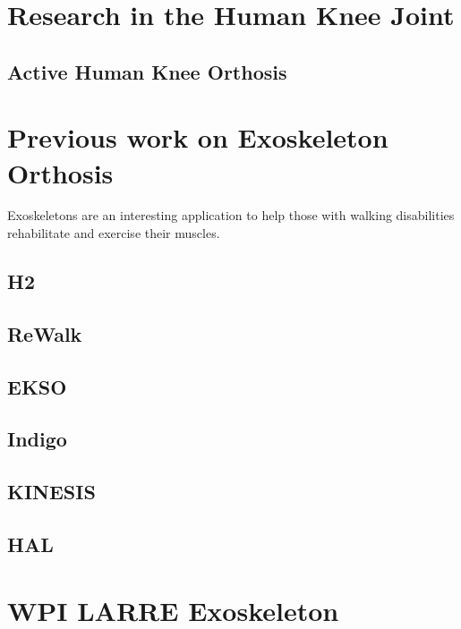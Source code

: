 \section{Research in the Human Knee Joint}

\subsection{Active Human Knee Orthosis}

\section{Previous work on Exoskeleton Orthosis}
Exoskeletons are an interesting application to help those with walking disabilities rehabilitate and exercise their muscles.

\subsection{H2}

\subsection{ReWalk}

\subsection{EKSO}

\subsection{Indigo}

\subsection{KINESIS}

\subsection{HAL}

\section{WPI LARRE Exoskeleton}

